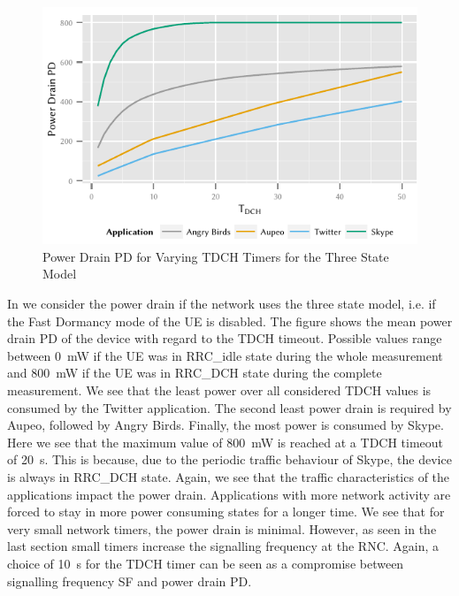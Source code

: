 \begin{figure}
	\centering
	\includegraphics{network/network_traces/numerical_results/figures/3_state_tdch_vs_power_drain}
	\caption{Power Drain \gls{PD} for Varying \gls{TDCH} Timers for the Three State Model}\label{fig:network:network_traces:numerical_results:three_states:power_drain}
\end{figure}
In  we consider the power drain if the network uses the three state model, i.e. if the Fast Dormancy mode of the \gls{UE} is disabled.
The figure shows the mean power drain \gls{PD} of the device with regard to the \gls{TDCH} timeout.
Possible values range between \SI{0}{\milli\watt} if the \gls{UE} was in \gls{RRC_idle} state during the whole measurement and \SI{800}{\milli\watt} if the \gls{UE} was in \gls{RRC_DCH} state during the complete measurement.
We see that the least power over all considered \gls{TDCH} values is consumed by the Twitter application.
The second least power drain is required by Aupeo, followed by Angry Birds.
Finally, the most power is consumed by Skype.
Here we see that the maximum value of \SI{800}{\milli\watt} is reached at a \gls{TDCH} timeout of \SI{20}{\second}.
This is because, due to the periodic traffic behaviour of Skype, the device is always in \gls{RRC_DCH} state.
Again, we see that the traffic characteristics of the applications impact the power drain.
Applications with more network activity are forced to stay in more power consuming states for a longer time.
We see that for very small network timers, the power drain is minimal.
However, as seen in the last section small timers increase the signalling frequency at the \gls{RNC}.
Again, a choice of \SI{10}{\second} for the \gls{TDCH} timer can be seen as a compromise between signalling frequency \gls{SF} and power drain \gls{PD}.

